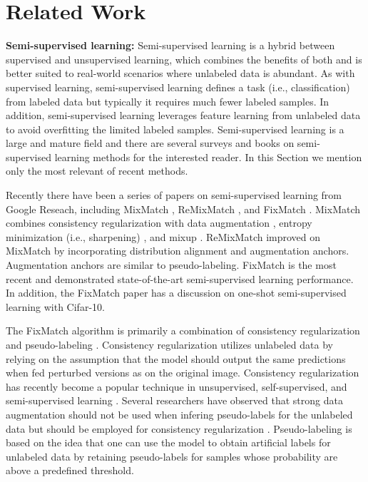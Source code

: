 \documentclass[final]{cvpr}
\newcommand{\SOTA}{state-of-the-art }
\newcommand{\OSSSL}{one-shot semi-supervised learning }
\newcommand{\SSL}{semi-supervised learning }
\begin{document}
\section{Related Work}
\label{sec:related}

\textbf{Semi-supervised learning:} 
Semi-supervised learning is a hybrid between supervised and unsupervised learning, which combines the benefits of both and is better suited to real-world scenarios where unlabeled data is abundant.
As with supervised learning, \SSL defines a task (i.e., classification) from labeled data but typically it requires much fewer labeled samples.
In addition, semi-supervised learning leverages feature learning from unlabeled data to avoid overfitting the limited labeled samples.
Semi-supervised learning is a large and mature field and there are several surveys and books on semi-supervised learning methods \cite{zhu2005semi,van2020survey,chapelle2009semi,zhu2009introduction} for the interested reader.
In this Section we mention only the most relevant of recent methods.

Recently there have been a series of papers on \SSL from Google Reseach, including MixMatch \cite{berthelot2019mixmatch} , ReMixMatch \cite{berthelot2019remixmatch}, and FixMatch \cite{sohn2020fixmatch}.  
MixMatch combines consistency regularization with data augmentation \cite{sajjadi2016regularization}, entropy minimization (i.e., sharpening) \cite{grandvalet2005semi}, and mixup \cite{zhang2017mixup}.
ReMixMatch improved on MixMatch by incorporating distribution alignment and augmentation anchors.
Augmentation anchors are similar to pseudo-labeling.
FixMatch is the most recent and demonstrated \SOTA \SSL performance. 
In addition, the FixMatch paper has a discussion on \OSSSL with Cifar-10.

The FixMatch algorithm \cite{sohn2020fixmatch} is primarily a combination of consistency regularization \cite{sajjadi2016regularization,zhai2019s4l} and pseudo-labeling \cite{lee2013pseudo}.
Consistency regularization utilizes unlabeled data by relying on the assumption that the model should output the same predictions when fed perturbed versions as on the original image.
Consistency regularization has recently become a popular technique in unsupervised, self-supervised, and semi-supervised learning \cite{van2020survey,zhai2019s4l}.
Several researchers have observed that strong data augmentation should not be used when infering pseudo-labels for the unlabeled data but should be employed for consistency regularization \cite{sohn2020fixmatch,xie2019self}.
Pseudo-labeling is based on the idea that one can use the model to obtain artificial labels for unlabeled data by retaining pseudo-labels for samples whose probability are above a predefined threshold.
\end{document}
